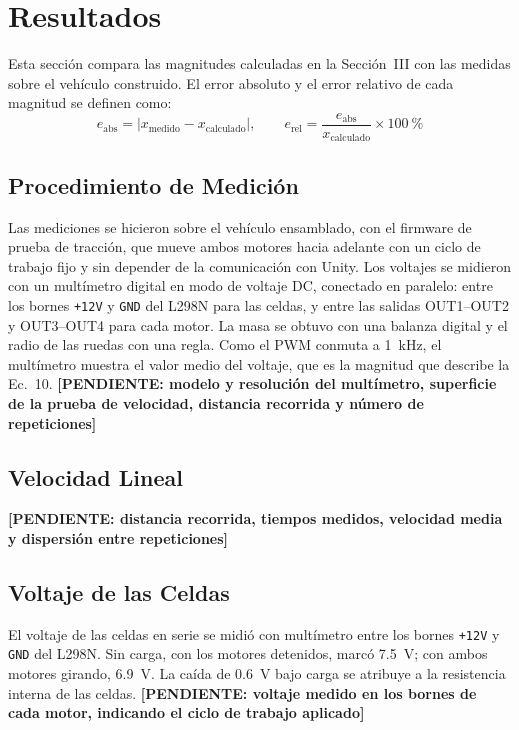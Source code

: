 \documentclass[conference]{IEEEtran}
\newcommand{\valBatteryNoLoadMeasured}{7.5}
\newcommand{\valBatteryLoadMeasured}{6.9}
\newcommand{\pendiente}[1]{\textbf{[PENDIENTE: #1]}}
\begin{document}
\section{Resultados}
Esta sección compara las magnitudes calculadas en la Sección~III con las medidas sobre el vehículo construido. El error absoluto y el error relativo de cada magnitud se definen como:
\begin{equation}
e_{\text{abs}} = \left|x_{\text{medido}} - x_{\text{calculado}}\right|,\qquad
e_{\text{rel}} = \frac{e_{\text{abs}}}{x_{\text{calculado}}}\times\SI{100}{\percent}
\end{equation}

\subsection{Procedimiento de Medición}
Las mediciones se hicieron sobre el vehículo ensamblado, con el firmware de prueba de tracción, que mueve ambos motores hacia adelante con un ciclo de trabajo fijo y sin depender de la comunicación con Unity. Los voltajes se midieron con un multímetro digital en modo de voltaje DC, conectado en paralelo: entre los bornes \texttt{+12V} y \texttt{GND} del L298N para las celdas, y entre las salidas OUT1--OUT2 y OUT3--OUT4 para cada motor. La masa se obtuvo con una balanza digital y el radio de las ruedas con una regla. Como el PWM conmuta a \SI{1}{kHz}, el multímetro muestra el valor medio del voltaje, que es la magnitud que describe la Ec.~10. \pendiente{modelo y resolución del multímetro, superficie de la prueba de velocidad, distancia recorrida y número de repeticiones}

\subsection{Velocidad Lineal}
\pendiente{distancia recorrida, tiempos medidos, velocidad media y dispersión entre repeticiones}

\subsection{Voltaje de las Celdas}
El voltaje de las celdas en serie se midió con multímetro entre los bornes \texttt{+12V} y \texttt{GND} del L298N. Sin carga, con los motores detenidos, marcó \SI{\valBatteryNoLoadMeasured}{V}; con ambos motores girando, \SI{\valBatteryLoadMeasured}{V}. La caída de \SI{0.6}{V} bajo carga se atribuye a la resistencia interna de las celdas.
\pendiente{voltaje medido en los bornes de cada motor, indicando el ciclo de trabajo aplicado}
\end{document}
